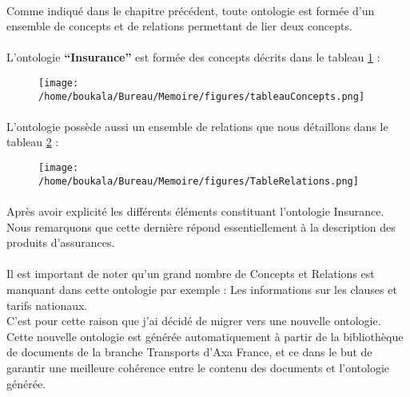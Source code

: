 \documentclass[12pt, a4paper, oneside]{book}
\begin{document}
\paragraph{}
Comme indiqué dans le chapitre précédent, toute ontologie est formée d'un ensemble de concepts et de relations permettant de lier deux concepts.
\paragraph{}
L'ontologie \textbf{“Insurance”} est formée des concepts décrits dans le tableau \ref{tableConcept} : 

\begin{figure}[h!]
\begin{center}
\texttt{[image: /home/boukala/Bureau/Memoire/figures/tableauConcepts.png]}
\label{tableConcept}
\end{center}
\end{figure}

\paragraph{}
L'ontologie possède aussi un ensemble de relations que nous détaillons dans le tableau \ref{tableRelation} : 

\begin{figure}[h!]
\begin{center}
\texttt{[image: /home/boukala/Bureau/Memoire/figures/TableRelations.png]}
\label{tableRelation}
\end{center}
\end{figure}


\paragraph{}
Après avoir explicité les différents éléments constituant l'ontologie Insurance. 
Nous remarquons que cette dernière répond essentiellement à la description des produits d'assurances. 
\paragraph{}
Il est important de noter qu'un grand nombre de Concepts et Relations est manquant dans cette ontologie par exemple : Les informations sur les clauses et tarifs nationaux.\\
C'est pour cette raison que j'ai décidé de migrer vers une nouvelle ontologie.\\
Cette nouvelle ontologie est générée automatiquement à partir de la bibliothèque de documents de la branche Transports d'Axa France, et ce dans le but de garantir une meilleure cohérence entre le contenu des documents et l'ontologie générée.
\end{document}
